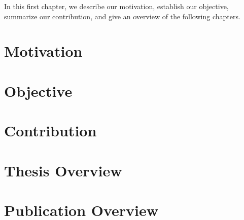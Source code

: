 In this first chapter, we describe our motivation, establish our objective,
summarize our contribution, and give an overview of the following chapters.

\section{Motivation}

\section{Objective}

\section{Contribution}

\section{Thesis Overview}

\section{Publication Overview}
